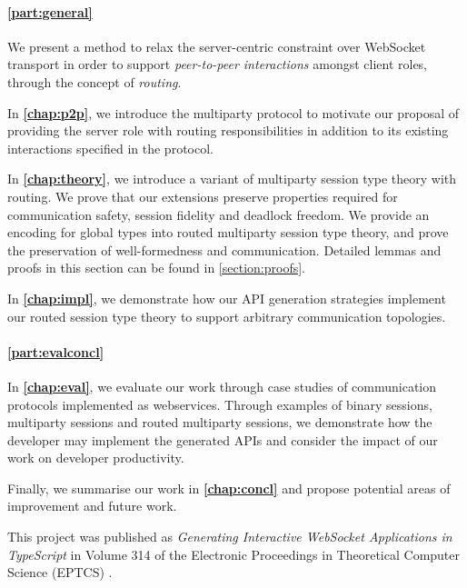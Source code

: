 \paragraph{\cref{part:general}} 
We present a method to relax the server-centric constraint over WebSocket
transport in order to support \textit{peer-to-peer interactions} 
amongst 
client roles, through the concept of \emph{routing}.

In \textbf{\cref{chap:p2p}}, 
we introduce the  multiparty
protocol to motivate our proposal of providing the server role with 
routing responsibilities in addition to its existing interactions
specified in the protocol.

In \textbf{\cref{chap:theory}}, 
we introduce a variant of multiparty 
session type theory with routing. We prove that our extensions preserve 
properties required for communication safety, 
session fidelity and deadlock freedom.
We provide an encoding for global types into routed multiparty 
session type theory, and prove the preservation of well-formedness
and communication. Detailed lemmas and proofs in this section can
be found in \cref{section:proofs}.

In \textbf{\cref{chap:impl}}, 
we demonstrate how our API generation strategies
implement our routed session type theory to support arbitrary communication
topologies.

\paragraph{\cref{part:evalconcl}}
In \textbf{\cref{chap:eval}}, 
we evaluate our work through 
case studies of communication protocols 
implemented as webservices. Through examples of binary sessions,
multiparty sessions and routed multiparty sessions, we demonstrate how the
developer may implement the generated APIs and consider the impact of our work
on developer productivity.

Finally, we summarise our work in \textbf{\cref{chap:concl}} 
and propose potential
areas of improvement and future work.

\begin{remark}
This project was published as \emph{Generating Interactive WebSocket 
Applications in TypeScript} in Volume 314 of the Electronic Proceedings
in Theoretical Computer Science (EPTCS) \cite{PLACES2020}.
\end{remark}